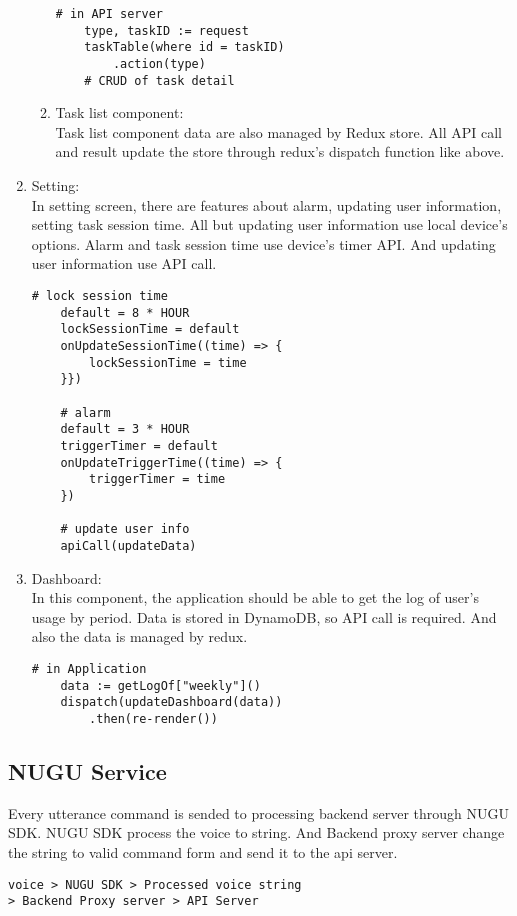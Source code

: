\documentclass[conference]{IEEEtran}
\begin{document}
\begin{enumerate}
\begin{enumerate}
    \begin{lstlisting}[frame=single]
    # in API server
    type, taskID := request
    taskTable(where id = taskID)
        .action(type)
    # CRUD of task detail
    \end{lstlisting}
        \item Task list component: \\
        Task list component data are also managed by Redux store. All API call and result update the store through redux's dispatch function like above.
    \end{enumerate}
    \item Setting: \\
    In setting screen, there are features about alarm, updating user information, setting task session time. All but updating user information use local device's options. Alarm and task session time use device's timer API. And updating user information use API call.
    \begin{lstlisting}[frame=single]
    # lock session time
    default = 8 * HOUR
    lockSessionTime = default
    onUpdateSessionTime((time) => {
        lockSessionTime = time
    }})
    
    # alarm
    default = 3 * HOUR
    triggerTimer = default
    onUpdateTriggerTime((time) => {
        triggerTimer = time
    })
    
    # update user info
    apiCall(updateData)
    \end{lstlisting}
    \item Dashboard: \\
    In this component, the application should be able to get the log of user's usage by period. Data is stored in DynamoDB, so API call is required. And also the data is managed by redux.
    \begin{lstlisting}[frame=single]
    # in Application
    data := getLogOf["weekly"]()
    dispatch(updateDashboard(data))
        .then(re-render())
    \end{lstlisting}
\end{enumerate}

\subsection{NUGU Service}

Every utterance command is sended to processing backend server through NUGU SDK. NUGU SDK process the voice to string. And Backend proxy server change the string to valid command form and send it to the api server.

\begin{lstlisting}[frame=single]
voice > NUGU SDK > Processed voice string
> Backend Proxy server > API Server
\end{lstlisting}
\end{document}
